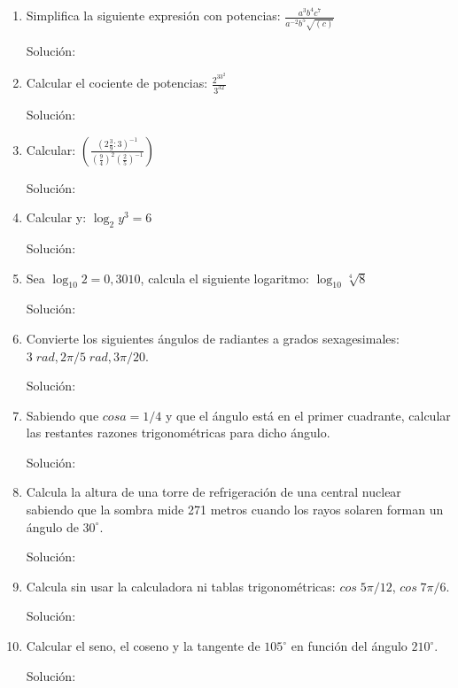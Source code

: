 \documentclass[11pt,letterpaper]{article}
\begin{document}
\begin{enumerate}

	\item Simplifica la siguiente expresión con potencias: $\frac{a^3b^4c^7}{a^{-2}b^5\sqrt{(c)}}$

	Solución:

	\item Calcular el cociente de potencias: $\frac{2^33^2}{3^32}$

	Solución:
	
	\item Calcular: $\left( \frac{\left( 2 \frac{3}{9} : 3\right)^{-1}}{\left(\frac{9}{4}\right)^2\left(\frac{2}{5}\right)^{-1}} \right)$

	Solución:

	\item Calcular y: $\log_{2}y^3 = 6$

	Solución:

	\item Sea $\log_{10}2 = 0,3010$, calcula el siguiente logaritmo: $\log_{10}\sqrt[4]{8}$

	Solución:

	\item Convierte los siguientes ángulos de radiantes a grados sexagesimales: $3\;rad, 2\pi/5\;rad, 3\pi/20$. 

	Solución:
	
	\item Sabiendo que $cosa=1/4$ y que el ángulo está en el primer cuadrante, calcular las restantes razones trigonométricas para dicho ángulo.

	Solución:

	\item Calcula la altura de una torre de refrigeración de una central nuclear sabiendo que la sombra mide 271 metros cuando los rayos solaren forman un ángulo de $30^\circ$.

	Solución:

	\item Calcula sin usar la calculadora ni tablas trigonométricas: $cos\;5\pi/12$, $cos\;7\pi/6$.

	Solución:

	\item Calcular el seno, el coseno y la tangente de $105^\circ$ en función del ángulo $210^\circ$. 

	Solución:

\end{enumerate}
\end{document}
